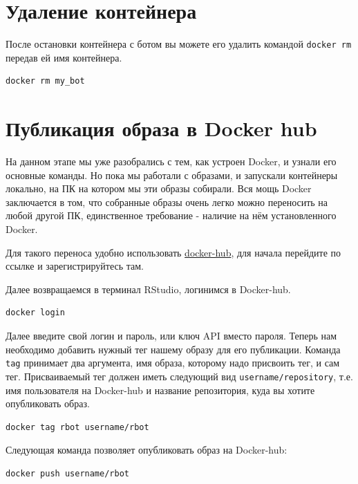 \documentclass[
]{book}
\begin{document}
\section{Удаление контейнера}\label{ux443ux434ux430ux43bux435ux43dux438ux435-ux43aux43eux43dux442ux435ux439ux43dux435ux440ux430}

После остановки контейнера с ботом вы можете его удалить командой \texttt{docker\ rm} передав ей имя контейнера.

\begin{verbatim}
docker rm my_bot
\end{verbatim}

\section{Публикация образа в Docker hub}\label{ux43fux443ux431ux43bux438ux43aux430ux446ux438ux44f-ux43eux431ux440ux430ux437ux430-ux432-docker-hub}

На данном этапе мы уже разобрались с тем, как устроен Docker, и узнали его основные команды. Но пока мы работали с образами, и запускали контейнеры локально, на ПК на котором мы эти образы собирали. Вся мощь Docker заключается в том, что собранные образы очень легко можно переносить на любой другой ПК, единственное требование - наличие на нём установленного Docker.

Для такого переноса удобно использовать \href{https://hub.docker.com/}{docker-hub}, для начала перейдите по ссылке и зарегистрируйтесь там.

Далее возвращаемся в терминал RStudio, логинимся в Docker-hub.

\begin{verbatim}
docker login
\end{verbatim}

Далее введите свой логин и пароль, или ключ API вместо пароля. Теперь нам необходимо добавить нужный тег нашему образу для его публикации. Команда \texttt{tag} принимает два аргумента, имя образа, которому надо присвоить тег, и сам тег. Присваиваемый тег должен иметь следующий вид \texttt{username/repository}, т.е. имя пользователя на Docker-hub и название репозитория, куда вы хотите опубликовать образ.

\begin{verbatim}
docker tag rbot username/rbot
\end{verbatim}

Следующая команда позволяет опубликовать образ на Docker-hub:

\begin{verbatim}
docker push username/rbot
\end{verbatim}
\end{document}
